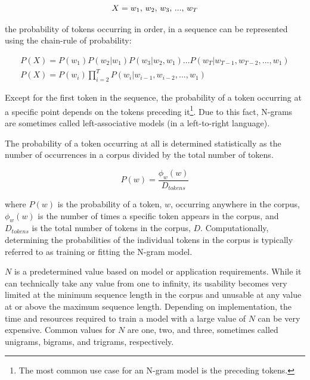 \documentclass[12pt]{article}
\begin{document}
\begin{equation}\label{eq:ngram_sequence}
    X = \mbox{$w_1$, $w_2$, $w_3$, ..., $w_T$}\\
\end{equation}

\noindent
the probability of tokens occurring in order, in a sequence can be represented using the chain-rule of probability:

\begin{equation}
    \begin{gathered}
        P(X) = P(w_1) P(w_2|w_1) P(w_3|w_2, w_1) ... P(w_T|w_{T-1}, w_{T-2}, ..., w_1)\\
        P(X) = P(w_i)\prod_{i=2}^{T} P(w_i|w_{i-1}, w_{i-2}, ..., w_1)
    \end{gathered}
\end{equation}

\noindent
Except for the first token in the sequence, the probability of a token occurring at a specific point depends on the tokens preceding
it\footnote{The most common use case for an N-gram model is the preceding tokens.}. Due to this fact, N-grams are sometimes called left-associative
models (in a left-to-right language).

The probability of a token occurring at all is determined statistically as the number of occurrences in a corpus divided by the total number of tokens.

\begin{equation}\label{eq:ngram_prob_wj}
    P(w) = \frac{\phi_w(w)}{D_{tokens}}
\end{equation}

\noindent
where $P(w)$ is the probability of a token, $w$, occurring anywhere in the corpus, $\phi_w(w)$ is the number of times a specific token appears in the
corpus, and $D_{tokens}$ is the total number of tokens in the corpus, $D$. Computationally, determining the probabilities of the individual tokens in
the corpus is typically referred to as training or fitting the N-gram model.

$N$ is a predetermined value based on model or application requirements. While it can technically take any value from one to infinity, its usability
becomes very limited at the minimum sequence length in the corpus and unusable at any value at or above the maximum sequence length. Depending on
implementation, the time and resources required to train a model with a large value of $N$ can be very expensive. Common values for $N$ are one, two,
and three, sometimes called unigrams, bigrams, and trigrams, respectively.
\end{document}
